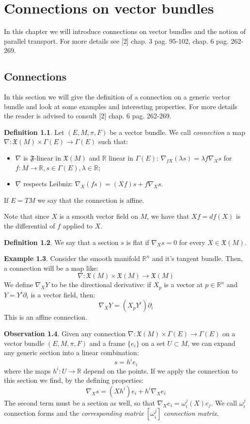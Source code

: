 \documentclass[12pt,a4paper]{report}
\theoremstyle{definition}
\newtheorem{Def}{Definition}[chapter]
\theoremstyle{Theorem}
\theoremstyle{definition}
\newtheorem{Ex}[Def]{Example}
\theoremstyle{definition}
\newtheorem{Obs}[Def]{Observation}
\begin{document}
	\chapter{Connections on vector bundles}
	In this chapter we will introduce connections on vector bundles and the notion of parallel transport. For more details see [2] chap. 3 pag. 95-102, chap. 6 pag. 262-269.
	\section{Connections}
	In this section we will give the definition of a connection on a generic vector bundle and look at some examples and interesting properties. For more details the reader is advised to consult [2] chap. 6 pag. 262-269.
	\begin{Def}\label{Def_5.7}
		Let $(E,M,\pi,F)$ be a vector bundle. We call \textit{connection} a map $\nabla:\mathfrak{X}(M)\times\Gamma(E)\rightarrow\Gamma(E)$ such that:
		\begin{itemize}
			\item $\nabla$ is $\mathfrak{F}$-linear in $\mathfrak{X}(M)$ and $\mathbb{R}$ linear in $\Gamma(E)$: $\nabla_{fX}(\lambda s)=\lambda f\nabla_X s$ for $f:M\rightarrow \mathbb{R}, s\in\Gamma(E),\lambda\in\mathbb{R}$;
			\item $\nabla$ respects Leibniz: $\nabla_X (fs)=(Xf)s+f\nabla_X s$.
		\end{itemize}
		If $E=TM$ we say that the connection is affine.
	\end{Def}
	Note that since $X$ is a smooth vector field on $M$, we have that $Xf=df(X)$ is the differential of $f$ applied to $X$.
	\begin{Def}\label{Def_5.8}
		We say that a section $s$ is flat if $\nabla_X s=0$ for every $X\in \mathfrak{X}(M)$.
	\end{Def}
	\begin{Ex}
		Consider the smooth manifold $\mathbb{R}^n$ and it's tangent bundle. Then, a connection will be a map like:
		$$\nabla:\mathfrak{X}(M)\times\mathfrak{X}(M)\rightarrow\mathfrak{X}(M)$$
		We define $\nabla_XY$ to be the directional derivative: if $X_p$ is a vector at $p\in\mathbb{R}^n$ and $Y=Y^i\partial_i$ is a vector field, then:
		$$\nabla_XY=(X_pY^i)\partial_i$$
		This is an affine connection.
	\end{Ex}
	\begin{Obs}
		Given any connection $\nabla:\mathfrak{X}(M)\times\Gamma(E)\rightarrow\Gamma(E)$ on a vector bundle $(E,M,\pi,F)$ and a frame $\{e_i\}$ on a set $U\subset M$, we can expand any generic section into a linear combination:
		$$s=h^ie_i$$
		where the maps $h^i:U\rightarrow \mathbb{R}$ depend on the points. If we apply the connection to this section we find, by the defining properties:
		$$\nabla_Xs=(Xh^i)e_i+h^i\nabla_Xe_i$$
		The second term must be a section as well, so that $\nabla_Xe_i=\omega^j_i(X)e_j$. We call $\omega^j_i$ connection forms and the \textit{corresponding matrix} $[\omega^j_i]$ \textit{connection matrix}. 
	\end{Obs}
\end{document}
